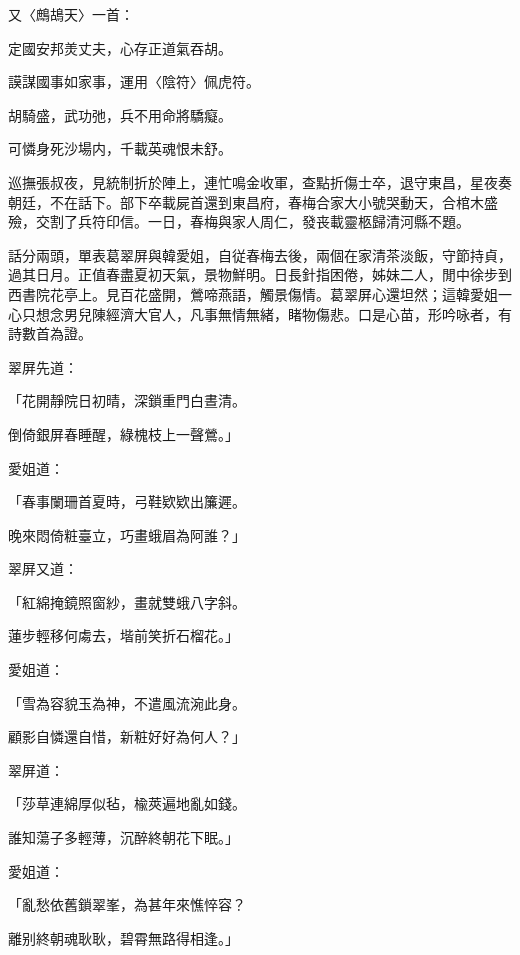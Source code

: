 又〈鷓鴣天〉一首：
\begin{myquote}
定國安邦羙丈夫，心存正道氣吞胡。

謨謀國事如家事，運用〈陰符〉佩虎符。

胡騎盛，武功弛，兵不用命將驕癡。

可憐身死沙場内，千載英魂恨未舒。
\end{myquote}

巡撫張叔夜，見統制折於陣上，連忙鳴金收軍，查點折傷士卒，退守東昌，星夜奏朝廷，不在話下。部下卒載屍首還到東昌府，春梅合家大小號哭動天，合棺木盛殮，交割了兵符印信。一日，春梅與家人周仁，發丧載靈柩歸清河縣不題。

話分兩頭，單表葛翠屏與韓愛姐，自従春梅去後，兩個在家清茶淡飯，守節持貞，過其日月。正值春盡夏初天氣，景物鮮明。日長針指困倦，姊妹二人，閒中徐步到西書院花亭上。見百花盛開，鶯啼燕語，觸景傷情。葛翠屏心還坦然；這韓愛姐一心只想念男兒陳經濟大官人，凡事無情無緒，睹物傷悲。口是心苗，形吟咏者，有詩數首為證。

翠屏先道：
\begin{myquote}
「花開靜院日初晴，深鎖重門白晝清。

倒倚銀屏春睡醒，綠槐枝上一聲鶯。」
\end{myquote}

愛姐道：
\begin{myquote}
「春事闌珊首夏時，弓鞋欵欵出簾遲。

晚來悶倚粧臺立，巧畫蛾眉為阿誰？」
\end{myquote}

翠屏又道：
\begin{myquote}
「紅綿掩鏡照窗紗，畫就雙蛾八字斜。

蓮步輕移何䖏去，堦前笑折石榴花。」
\end{myquote}

愛姐道：
\begin{myquote}
「雪為容貌玉為神，不遣風流涴此身。

顧影自憐還自惜，新粧好好為何人？」
\end{myquote}

翠屏道：
\begin{myquote}
「莎草連綿厚似毡，楡莢遍地亂如錢。

誰知蕩子多輕薄，沉醉終朝花下眠。」
\end{myquote}

愛姐道：
\begin{myquote}
「亂愁依舊鎖翠峯，為甚年來憔悴容？

離别終朝魂耿耿，碧霄無路得相逢。」
\end{myquote}

